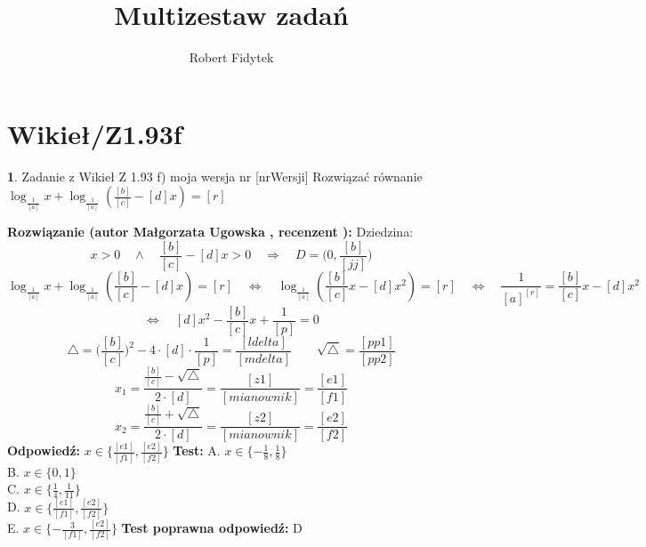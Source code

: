 \documentclass[12pt, a4paper]{article}
\title{Multizestaw zadań}
\author{Robert Fidytek}
\date{}
\theoremstyle{definition} %
\newtheorem{zad}{}
\newcommand{\kategoria}[1]{\section{#1}} %
\newcommand{\zadStart}[1]{\begin{zad}#1\newline} %
\newcommand{\zadStop}{\end{zad}}   %
\newcommand{\rozwStart}[2]{\noindent \textbf{Rozwiązanie (autor #1 , recenzent #2): }\newline} %
\newcommand{\rozwStop}{\newline}                                            %
\newcommand{\odpStart}{\noindent \textbf{Odpowiedź:}\newline}    %
\newcommand{\odpStop}{\newline}                                             %
\newcommand{\testStart}{\noindent \textbf{Test:}\newline} %
\newcommand{\testStop}{\newline} %
\newcommand{\kluczStart}{\noindent \textbf{Test poprawna odpowiedź:}\newline} %
\newcommand{\kluczStop}{\newline} %
\begin{document}
\maketitle


\kategoria{Wikieł/Z1.93f}
\zadStart{Zadanie z Wikieł Z 1.93 f) moja wersja nr [nrWersji]}
Rozwiązać równanie $\log_{\frac{1}{[a]}}{x} + \log_{\frac{1}{[a]}}{(\frac{[b]}{[c]}-[d]x)} = [r]$
\zadStop
\rozwStart{Małgorzata Ugowska}{}
Dziedzina:
$$ x>0 \quad \land \quad \frac{[b]}{[c]}-[d]x >0 \quad \Longrightarrow \quad D = \Big(0, \frac{[b]}{[jj]}\Big) $$
$$\log_{\frac{1}{[a]}}{x} + \log_{\frac{1}{[a]}}{(\frac{[b]}{[c]}-[d]x)} = [r] \quad \Longleftrightarrow \quad \log_{\frac{1}{[a]}}{(\frac{[b]}{[c]}x-[d]x^2)} = [r] \quad \Longleftrightarrow \quad \frac{1}{[a]^{[r]}} = \frac{[b]}{[c]}x-[d]x^2$$
$$\Longleftrightarrow \quad [d]x^2 - \frac{[b]}{[c]}x + \frac{1}{[p]} = 0 $$
$$ \bigtriangleup = \Big( \frac{[b]}{[c]} \Big)^2-4 \cdot [d] \cdot \frac{1}{[p]} = \frac{[ldelta]}{[mdelta]} \qquad \sqrt{\bigtriangleup} = \frac{[pp1]}{[pp2]}$$
$$ x_1=\frac{\frac{[b]}{[c]}-\sqrt{\bigtriangleup}}{2 \cdot [d]} = \frac{[z1]}{[mianownik]} = \frac{[e1]}{[f1]} $$
$$ x_2=\frac{\frac{[b]}{[c]}+\sqrt{\bigtriangleup}}{2 \cdot [d]} = \frac{[z2]}{[mianownik]} = \frac{[e2]}{[f2]}$$
\rozwStop
\odpStart
$x \in \{\frac{[e1]}{[f1]}, \frac{[e2]}{[f2]}\}$
\odpStop
\testStart
A. $x \in \{-\frac{1}{8}, \frac{1}{8}\}$\\
B. $x \in \{0, 1\}$\\
C. $x \in \{\frac{1}{4}, \frac{1}{11}\}$\\
D. $x \in \{\frac{[e1]}{[f1]}, \frac{[e2]}{[f2]}\}$\\
E. $x \in \{-\frac{3}{[f1]}, \frac{[e2]}{[f2]}\}$
\testStop
\kluczStart
D
\kluczStop
\end{document}
